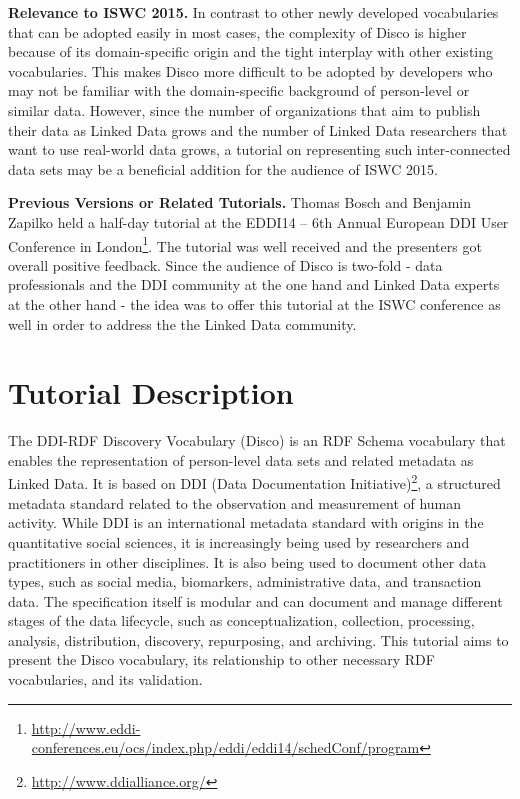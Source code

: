 \documentclass{llncs}
\begin{document}
\textbf{Relevance to ISWC 2015.}
In contrast to other newly developed vocabularies that can be adopted easily in most cases, the complexity of Disco is higher because of its domain-specific origin and the tight interplay with other existing vocabularies. This makes Disco more difficult to be adopted by developers who may not be familiar with the domain-specific background of person-level or similar data. However, since the number of organizations that aim to publish their data as Linked Data grows and the number of Linked Data researchers that want to use real-world data grows, a tutorial on representing such inter-connected data sets may be a beneficial addition for the audience of ISWC 2015.

\textbf{Previous Versions or Related Tutorials.}
Thomas Bosch and Benjamin Zapilko held a half-day tutorial at the EDDI14 – 6th Annual European DDI User Conference in London\footnote{\url{http://www.eddi-conferences.eu/ocs/index.php/eddi/eddi14/schedConf/program}}.
The tutorial was well received and the presenters got overall positive feedback. Since the audience of Disco is two-fold - data professionals and the DDI community at the one hand and Linked Data experts at the other hand - the idea was to offer this tutorial at the ISWC conference as well in order to address the the Linked Data community.

\section{Tutorial Description}

The DDI-RDF Discovery Vocabulary (Disco)\cite{Bosch2012,Bosch2013} is an RDF Schema vocabulary that enables the representation of person-level data sets and related metadata as Linked Data.
It is based on DDI (Data Documentation Initiative)\footnote{\url{http://www.ddialliance.org/}}, a structured metadata standard related to the observation and measurement of human activity.
While DDI is an international metadata standard with origins in the quantitative social sciences, it is increasingly being used by researchers and practitioners in other disciplines. It is also being used to document other data types, such as social media, biomarkers, administrative data, and transaction data. The specification itself is modular and can document and manage different stages of the data lifecycle, such as conceptualization, collection, processing, analysis, distribution, discovery, repurposing, and archiving.
This tutorial aims to present the Disco vocabulary, its relationship to other necessary RDF vocabularies, and its validation.
 
\end{document}
